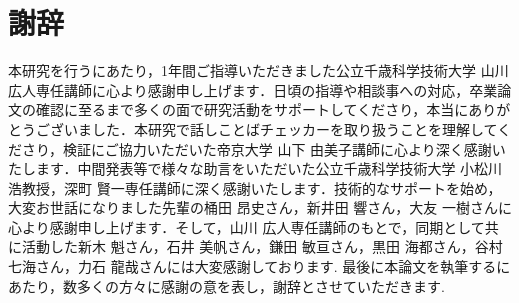 \documentclass[12pt, a4paper]{jreport}
\begin{document}
\chapter*{謝辞}
本研究を行うにあたり，1年間ご指導いただきました公立千歳科学技術大学 山川 広人専任講師に心より感謝申し上げます．日頃の指導や相談事への対応，卒業論文の確認に至るまで多くの面で研究活動をサポートしてくださり，本当にありがとうございました．本研究で話しことばチェッカーを取り扱うことを理解してくださり，検証にご協力いただいた帝京大学 山下 由美子講師に心より深く感謝いたします．中間発表等で様々な助言をいただいた公立千歳科学技術大学 小松川 浩教授，深町 賢一専任講師に深く感謝いたします．技術的なサポートを始め，大変お世話になりました先輩の桶田 昂史さん，新井田 響さん，大友 一樹さんに心より感謝申し上げます．そして，山川 広人専任講師のもとで，同期として共に活動した新木 魁さん，石井 美帆さん，鎌田 敏亘さん，黒田 海都さん，谷村 七海さん，力石 龍哉さんには大変感謝しております. 最後に本論文を執筆するにあたり，数多くの方々に感謝の意を表し，謝辞とさせていただきます.
\end{document}

